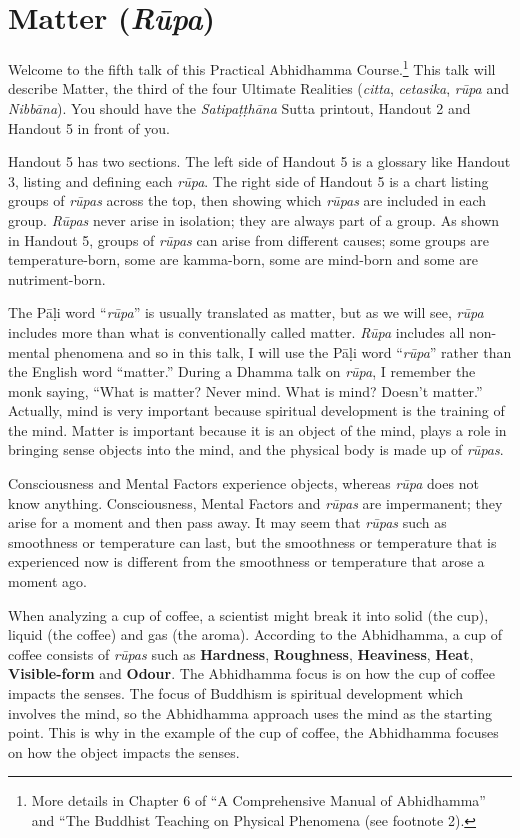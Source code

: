 \section{Matter (\textit{Rūpa})}

Welcome to the fifth talk of this Practical Abhidhamma Course.\footnote{More details in Chapter 6 of “A Comprehensive Manual of Abhidhamma” and “The Buddhist Teaching on Physical Phenomena (see footnote 2).} This talk will describe Matter, the third of the four Ultimate Realities (\textit{citta}, \textit{cetasika}, \textit{rūpa} and \textit{Nibbāna}). You should have the \textit{Satipaṭṭhāna} Sutta printout, Handout 2 and Handout 5 in front of you.

Handout 5 has two sections. The left side of Handout 5 is a glossary like Handout 3, listing and defining each \textit{rūpa}. The right side of Handout 5 is a chart listing groups of \textit{rūpas} across the top, then showing which \textit{rūpas} are included in each group. \textit{Rūpas} never arise in isolation; they are always part of a group. As shown in Handout 5, groups of \textit{rūpas} can arise from different causes; some groups are temperature-born, some are kamma-born, some are mind-born and some are nutriment-born.

The Pāḷi word “\textit{rūpa}” is usually translated as matter, but as we will see, \textit{rūpa} includes more than what is conventionally called matter. \textit{Rūpa} includes all non-mental phenomena and so in this talk, I will use the Pāḷi word “\textit{rūpa}” rather than the English word “matter.” During a Dhamma talk on \textit{rūpa}, I remember the monk saying, “What is matter? Never mind. What is mind? Doesn’t matter.” Actually, mind is very important because spiritual development is the training of the mind. Matter is important because it is an object of the mind, plays a role in bringing sense objects into the mind, and the physical body is made up of \textit{rūpas}.

Consciousness and Mental Factors experience objects, whereas \textit{rūpa} does not know anything. Consciousness, Mental Factors and \textit{rūpas} are impermanent; they arise for a moment and then pass away. It may seem that \textit{rūpas} such as smoothness or temperature can last, but the smoothness or temperature that is experienced now is different from the smoothness or temperature that arose a moment ago.

When analyzing a cup of coffee, a scientist might break it into solid (the cup), liquid (the coffee) and gas (the aroma). According to the Abhidhamma, a cup of coffee consists of \textit{rūpas} such as \textbf{Hardness}, \textbf{Roughness}, \textbf{Heaviness}, \textbf{Heat}, \textbf{Visible-form} and \textbf{Odour}. The Abhidhamma focus is on how the cup of coffee impacts the senses. The focus of Buddhism is spiritual development which involves the mind, so the Abhidhamma approach uses the mind as the starting point. This is why in the example of the cup of coffee, the Abhidhamma focuses on how the object impacts the senses.

